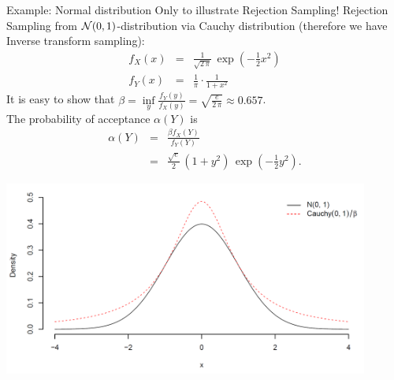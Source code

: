 \begin{vbframe}{Example: Normal distribution}
Only to illustrate Rejection Sampling!
Rejection Sampling from $\mathcal{N}(0,1)$-distribution via
Cauchy distribution (therefore we have Inverse transform sampling):
    \begin{eqnarray*}
        f_X(x) & = & \frac{1}{\sqrt{2\,\pi}} \,
            \exp(-\frac{1}{2}x^2) \\
        f_Y(x) & = & \frac{1}{\pi} \cdot \frac{1}{1 + x^2}
    \end{eqnarray*}
    It is easy to show that $\beta = \inf\limits_y \frac{f_Y(y)}{f_X(y)}
    = \sqrt{\frac{e}{2\,\pi}} \approx 0.657$. \\
    The probability of acceptance $\alpha(Y)$ is
    \begin{eqnarray*}
    \alpha(Y) &=& \frac{\beta f_X(Y)}{ f_Y(Y)} \\
              &=&  \frac{\sqrt{e}}{2} \, (1 + y^2) \,
                    \exp(-\frac{1}{2}y^2).
    \end{eqnarray*}

\framebreak

\lz

\begin{center}
\includegraphics[width =0.9\textwidth]{figure_man/example.png}
\end{center}




\framebreak
\lz


\end{vbframe}
